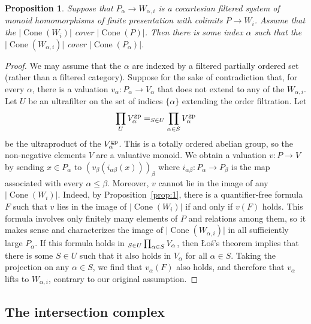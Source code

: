 \documentclass[10pt]{article}
\numberwithin{equation}{section}
\newtheorem{proposition}[paragraph]{Proposition}
\theoremstyle{definition}
\theoremstyle{remark}
\def\Cone{\operatorname{Cone}}
\let \varinjlim \relax
\DeclareMathOperator*{\varinjlim}{colim}
\begin{document}
\begin{proposition} \label{prop:3}
	Suppose that $P_\alpha \to W_{\alpha,i}$ is a cocartesian filtered system of monoid homomorphisms of finite presentation with colimits $P \to W_i$.  Assume that the $\lvert\Cone(W_i)\rvert$ cover $\lvert\Cone(P)\rvert$.  Then there is some index $\alpha$ such that the $\lvert\Cone(W_{\alpha,i})\rvert$ cover $\lvert\Cone(P_\alpha)\rvert$.
\end{proposition}
\begin{proof}
	We may assume that the $\alpha$ are indexed by a filtered partially ordered set (rather than a filtered category).  Suppose for the sake of contradiction that, for every $\alpha$, there is a valuation $v_\alpha : P_\alpha \to V_\alpha$ that does not extend to any of the $W_{\alpha,i}$.  Let $U$ be an ultrafilter on the set of indices $\{ \alpha \}$ extending the order filtration.  Let 
	\begin{equation*}
		\prod_U V_\alpha^{\rm gp} = \varinjlim_{S \in U} \prod_{\alpha \in S} V_\alpha^{\rm gp}
	\end{equation*}
	be the ultraproduct of the $V_\alpha^{\rm gp}$.  This is a totally ordered abelian group, so the non-negative elements $V$ are a valuative monoid.  We obtain a valuation $v : P \to V$ by sending $x \in P_\alpha$ to $(v_\beta(i_{\alpha\beta}(x)))_\beta$ where $i_{\alpha\beta} : P_\alpha \to P_\beta$ is the map associated with every $\alpha \leq \beta$.  Moreover, $v$ cannot lie in the image of any $\lvert\Cone(W_i)\rvert$.  Indeed, by Proposition~\ref{prop:1}, there is a quantifier-free formula $F$ such that $v$ lies in the image of $\lvert\Cone(W_{i})\rvert$ if and only if $v(F)$ holds.  This formula involves only finitely many elements of $P$ and relations among them, so it makes sense and characterizes the image of $\lvert\Cone(W_{\alpha,i})\rvert$ in all sufficiently large $P_\alpha$.  If this formula holds in $\varinjlim_{S \in U} \prod_{\alpha \in S} V_\alpha$, then \L o\'s's theorem implies that there is some $S \in U$ such that it also holds in $V_\alpha$ for all $\alpha \in S$.  Taking the projection on any $\alpha \in S$, we find that $v_\alpha(F)$ also holds, and therefore that $v_\alpha$ lifts to $W_{\alpha,i}$, contrary to our original assumption.
\end{proof}







\subsection{The intersection complex}
\end{document}
